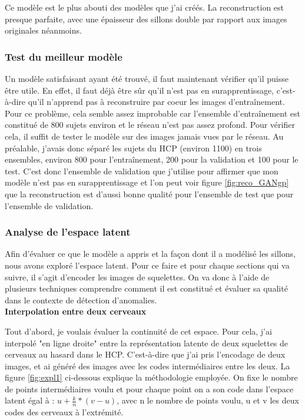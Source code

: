 \documentclass[12pt, oneside, a4paper, titlepage]{article}
\begin{document}
Ce modèle est le plus abouti des modèles que j'ai créés. La reconstruction est presque parfaite, avec une épaisseur des sillons double par rapport aux images originales néanmoins.


\subsubsection{Test du meilleur modèle}

Un modèle satisfaisant ayant été trouvé, il faut maintenant vérifier qu'il puisse être utile. En effet, il faut déjà être sûr qu'il n'est pas en surapprentissage, c'est-à-dire qu'il n'apprend pas à reconstruire par coeur les images d'entraînement. Pour ce problème, cela semble assez improbable car l'ensemble d'entraînement est constitué de 800 sujets environ et le réseau n'est pas assez profond. Pour vérifier cela, il suffit de tester le modèle sur des images jamais vues par le réseau. Au préalable, j'avais donc séparé les sujets du HCP (environ 1100) en trois ensembles, environ 800 pour l'entraînement, 200 pour la validation et 100 pour le test. C'est donc l'ensemble de validation que j'utilise pour affirmer que mon modèle n'est pas en surapprentissage et l'on peut voir figure \ref{fig:reco_GANgp} que la reconstruction est d'aussi bonne qualité pour l'ensemble de test que pour l'ensemble de validation.

\subsubsection{Analyse de l'espace latent}

Afin d'évaluer ce que le modèle a appris et la façon dont il a modélisé les sillons, nous avons exploré l'espace latent. Pour ce faire et pour chaque sections qui va suivre, il s'agit d'encoder les images de squelettes. On va donc à l'aide de plusieurs techniques comprendre comment il est constitué et évaluer sa qualité dans le contexte de détection d'anomalies.\\

\textbf{Interpolation entre deux cerveaux}

Tout d'abord, je voulais évaluer la continuité de cet espace. Pour cela, j'ai interpolé "en ligne droite" entre la représentation latente de deux squelettes de cerveaux au hasard dans le HCP. C'est-à-dire que j'ai pris l'encodage de deux images, et ai généré des images avec les codes intermédiaires entre les deux.  La figure \ref{fig:expl1} ci-dessous explique la méthodologie employée. On fixe le nombre de points intermédiaires voulu et pour chaque point on a son code dans l'espace latent égal à : \(u + \frac{k}{n} * (v-u) \), avec n le nombre de points voulu, u et v les deux codes des cerveaux à l'extrémité.
\end{document}
